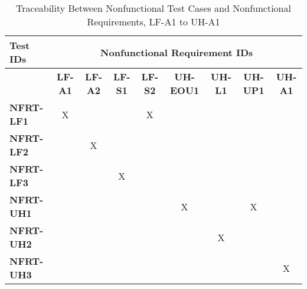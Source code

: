 \documentclass[12pt, titlepage]{article}
\begin{document}
\begin{landscape}
		\begin{longtable}{|l|cccccccc|}
	\caption{Traceability Between Nonfunctional Test Cases and Nonfunctional Requirements, LF-A1 to UH-A1}                                                                                                                                                                                                                           \\
		\hline
		\textbf{Test IDs}   & \multicolumn{8}{c|}{\textbf{Nonfunctional Requirement IDs}}                                                                                                                                                                                                                 \\
		\hline
		~                   & \textbf{LF-A1}  & \textbf{LF-A2} & \textbf{LF-S1} & \textbf{LF-S2} & \textbf{UH-EOU1} & \textbf{UH-L1} & \textbf{UH-UP1} & \textbf{UH-A1} \\
		\hline
		\textbf{NFRT-LF1} & X                                                         & ~             & ~             & X             & ~             & ~             & ~             & ~\\
		\textbf{NFRT-LF2} & ~                                                         & X             & ~             & ~             & ~             & ~             & ~             & ~\\
		\textbf{NFRT-LF3} & ~                                                         & ~             & X             & ~             & ~             & ~             & ~             & ~\\
		\textbf{NFRT-UH1} & ~                                                         & ~             & ~             & ~             & X             & ~             & X             & ~\\
		\textbf{NFRT-UH2} & ~                                                         & ~             & ~             & ~             & ~             & X             & ~             & ~\\
		\textbf{NFRT-UH3} & ~                                                         & ~             & ~             & ~             & ~             & ~             & ~             & X\\
		\hline
	\end{longtable}

	\newpage
	

\end{landscape}
\end{document}
